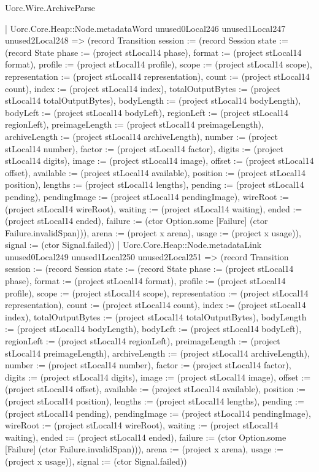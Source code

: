 \begin{lexlean}{Uorc.Wire.ArchiveParse}
\begin{semanticmodule}
{            | Uorc.Core.Heap::Node.metadataWord unused0Local246 unused1Local247 unused2Local248 => (record Transition {session := (record Session {state := (record State {phase := (project stLocal14 phase), format := (project stLocal14 format), profile := (project stLocal14 profile), scope := (project stLocal14 scope), representation := (project stLocal14 representation), count := (project stLocal14 count), index := (project stLocal14 index), totalOutputBytes := (project stLocal14 totalOutputBytes), bodyLength := (project stLocal14 bodyLength), bodyLeft := (project stLocal14 bodyLeft), regionLeft := (project stLocal14 regionLeft), preimageLength := (project stLocal14 preimageLength), archiveLength := (project stLocal14 archiveLength), number := (project stLocal14 number), factor := (project stLocal14 factor), digits := (project stLocal14 digits), image := (project stLocal14 image), offset := (project stLocal14 offset), available := (project stLocal14 available), position := (project stLocal14 position), lengths := (project stLocal14 lengths), pending := (project stLocal14 pending), pendingImage := (project stLocal14 pendingImage), wireRoot := (project stLocal14 wireRoot), waiting := (project stLocal14 waiting), ended := (project stLocal14 ended), failure := (ctor Option.some [Failure] (ctor Failure.invalidSpan))}), arena := (project x arena), usage := (project x usage)}), signal := (ctor Signal.failed)})
            | Uorc.Core.Heap::Node.metadataLink unused0Local249 unused1Local250 unused2Local251 => (record Transition {session := (record Session {state := (record State {phase := (project stLocal14 phase), format := (project stLocal14 format), profile := (project stLocal14 profile), scope := (project stLocal14 scope), representation := (project stLocal14 representation), count := (project stLocal14 count), index := (project stLocal14 index), totalOutputBytes := (project stLocal14 totalOutputBytes), bodyLength := (project stLocal14 bodyLength), bodyLeft := (project stLocal14 bodyLeft), regionLeft := (project stLocal14 regionLeft), preimageLength := (project stLocal14 preimageLength), archiveLength := (project stLocal14 archiveLength), number := (project stLocal14 number), factor := (project stLocal14 factor), digits := (project stLocal14 digits), image := (project stLocal14 image), offset := (project stLocal14 offset), available := (project stLocal14 available), position := (project stLocal14 position), lengths := (project stLocal14 lengths), pending := (project stLocal14 pending), pendingImage := (project stLocal14 pendingImage), wireRoot := (project stLocal14 wireRoot), waiting := (project stLocal14 waiting), ended := (project stLocal14 ended), failure := (ctor Option.some [Failure] (ctor Failure.invalidSpan))}), arena := (project x arena), usage := (project x usage)}), signal := (ctor Signal.failed)})
}
\end{semanticmodule}
\end{lexlean}
